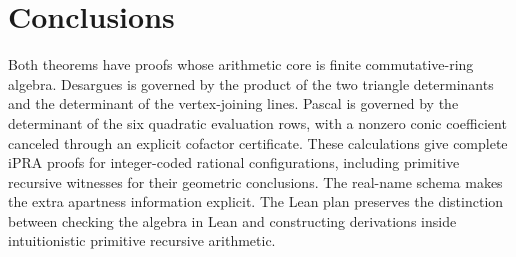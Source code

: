 \section{Conclusions}
Both theorems have proofs whose arithmetic core is finite
commutative-ring algebra. Desargues is governed by the product of the
two triangle determinants and the determinant of the vertex-joining
lines. Pascal is governed by the determinant of the six quadratic
evaluation rows, with a nonzero conic coefficient canceled through an
explicit cofactor certificate. These calculations give complete iPRA
proofs for integer-coded rational configurations, including primitive
recursive witnesses for their geometric conclusions. The real-name
schema makes the extra apartness information explicit. The Lean plan
preserves the distinction between checking the algebra in Lean and
constructing derivations inside intuitionistic primitive recursive
arithmetic.

